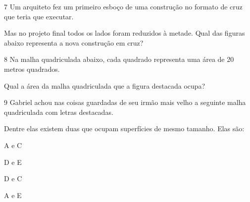 \num{7} Um arquiteto fez um primeiro esboço de uma construção no formato de
cruz que teria que executar.


Mas no projeto final todos os lados foram reduzidos à metade. Qual das
figuras abaixo representa a nova construção em cruz?



\num{8} Na malha quadriculada abaixo, cada quadrado representa uma área de
20 metros quadrados.


Qual a área da malha quadriculada que a figura destacada ocupa?



\num{9} Gabriel achou nas coisas guardadas de seu irmão mais velho a
seguinte malha quadriculada com letras destacadas.


Dentre elas existem duas que ocupam superfícies de mesmo tamanho. Elas
são:

\begin{escolha}
\item
  A e C
\item
  D e E
\item
  D e C
\item
  A e E
\end{escolha}


